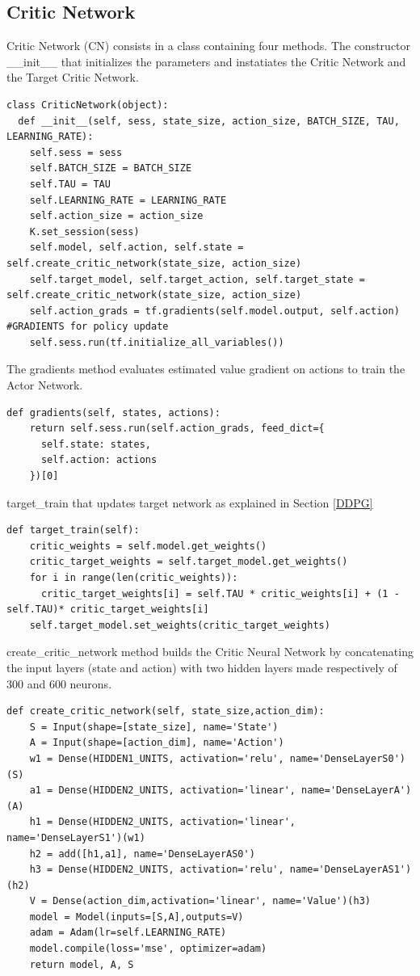 \documentclass[Lau,oneside,noexaminfo]{sapthesis} %
\begin{document}
\subsection{Critic Network}
Critic Network (CN) consists in a class containing four methods.
The constructor \_\_init\_\_ that initializes the parameters and instatiates the Critic Network and the Target Critic Network.
\begin{lstlisting}
class CriticNetwork(object):
  def __init__(self, sess, state_size, action_size, BATCH_SIZE, TAU, LEARNING_RATE):
    self.sess = sess
    self.BATCH_SIZE = BATCH_SIZE
    self.TAU = TAU
    self.LEARNING_RATE = LEARNING_RATE
    self.action_size = action_size
    K.set_session(sess)
    self.model, self.action, self.state = self.create_critic_network(state_size, action_size)  
    self.target_model, self.target_action, self.target_state = self.create_critic_network(state_size, action_size)  
    self.action_grads = tf.gradients(self.model.output, self.action)  #GRADIENTS for policy update
    self.sess.run(tf.initialize_all_variables())
\end{lstlisting}
The gradients method evaluates estimated value gradient on actions to train the Actor Network.
\begin{lstlisting}[firstnumber=13]
  def gradients(self, states, actions):
    return self.sess.run(self.action_grads, feed_dict={
      self.state: states,
      self.action: actions
    })[0]
\end{lstlisting}
target\_train that updates target network as explained in Section \ref{DDPG}
\begin{lstlisting}[firstnumber=18]
  def target_train(self):
    critic_weights = self.model.get_weights()
    critic_target_weights = self.target_model.get_weights()
    for i in range(len(critic_weights)):
      critic_target_weights[i] = self.TAU * critic_weights[i] + (1 - self.TAU)* critic_target_weights[i]
    self.target_model.set_weights(critic_target_weights)
\end{lstlisting}
create\_critic\_network method builds the Critic Neural Network by concatenating the input layers (state and action) with two hidden layers made respectively of 300 and 600 neurons.
\begin{lstlisting}[firstnumber=24]
  def create_critic_network(self, state_size,action_dim):
    S = Input(shape=[state_size], name='State')  
    A = Input(shape=[action_dim], name='Action')   
    w1 = Dense(HIDDEN1_UNITS, activation='relu', name='DenseLayerS0')(S)
    a1 = Dense(HIDDEN2_UNITS, activation='linear', name='DenseLayerA')(A) 
    h1 = Dense(HIDDEN2_UNITS, activation='linear', name='DenseLayerS1')(w1)
    h2 = add([h1,a1], name='DenseLayerAS0')    
    h3 = Dense(HIDDEN2_UNITS, activation='relu', name='DenseLayerAS1')(h2)
    V = Dense(action_dim,activation='linear', name='Value')(h3)   
    model = Model(inputs=[S,A],outputs=V)
    adam = Adam(lr=self.LEARNING_RATE)
    model.compile(loss='mse', optimizer=adam)
    return model, A, S
\end{lstlisting}
\end{document}
